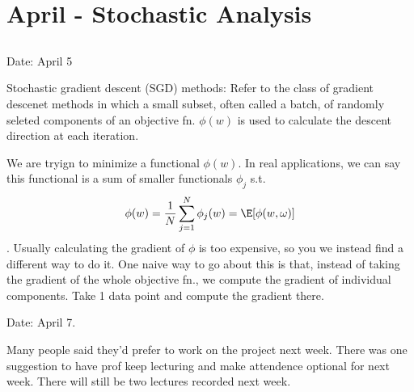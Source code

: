 \chapter{April - Stochastic Analysis }

\section{}


Date: April 5

Stochastic gradient descent (SGD) methods: Refer to the class of gradient descenet methods in which a small subset, often called a batch, of randomly seleted components of an objective fn. $\phi(w)$ is used to calculate the descent direction at each iteration. 

We are tryign to minimize a functional $\phi(w)$. In real applications, we can say this functional is a sum of smaller functionals $\phi_j$ s.t. 
\[ \phi(w) = \frac{1}{N} \sum_{j=1}^N \phi_j(w) 
	= \E [\phi(w, \omega)] \]. Usually calculating the gradient of $\phi$ is too expensive, so you we instead find a different way to do it. One naive way to go about this is that, instead of taking the gradient of the whole objective fn., we compute the gradient of individual components. Take 1 data point and compute the gradient there. 

Date: April 7. 

Many people said they'd prefer to work on the project next week. There was one suggestion to have prof keep lecturing and make attendence optional for next week. There will still be two lectures recorded next week. 